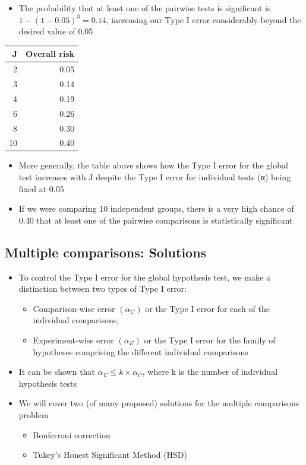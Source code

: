 \documentclass[
]{book}
\providecommand{\tightlist}{%
  \setlength{\itemsep}{0pt}\setlength{\parskip}{0pt}}
\begin{document}
\begin{itemize}
  \begin{itemize}
  \tightlist
  \item
    The probability that at least one of the pairwise tests is significant is \(1-(1-0.05)^3 = 0.14\), increasing our Type I error considerably beyond the desired value of 0.05
  \end{itemize}
\end{itemize}

\begin{tabular}{r|r}
\hline
J &  Overall risk\\
\hline
2 & 0.05\\
\hline
3 & 0.14\\
\hline
4 & 0.19\\
\hline
6 & 0.26\\
\hline
8 & 0.30\\
\hline
10 & 0.40\\
\hline
\end{tabular}

\begin{itemize}
\tightlist
\item
  More generally, the table above shows how the Type I error for the global test increases with J despite the Type I error for individual tests (α) being fixed at 0.05
\item
  If we were comparing 10 independent groups, there is a very high chance of 0.40 that at least one of the pairwise comparisons is statistically significant
\end{itemize}

\hypertarget{multiple-comparisons-solutions}{%
\subsection{Multiple comparisons: Solutions}\label{multiple-comparisons-solutions}}

\begin{itemize}
\tightlist
\item
  To control the Type I error for the global hypothesis test, we make a distinction between two types of Type I error:

  \begin{itemize}
  \tightlist
  \item
    Comparison-wise error \((α_C)\) or the Type I error for each of the individual comparisons,
  \item
    Experiment-wise error \((α_E)\) or the Type I error for the family of hypotheses comprising the different individual comparisons
  \end{itemize}
\item
  It can be shown that \(α_E ≤ k × α_C\), where k is the number of individual hypothesis tests
\item
  We will cover two (of many proposed) solutions for the multiple comparisons problem

  \begin{itemize}
  \tightlist
  \item
    Bonferroni correction
  \item
    Tukey's Honest Significant Method (HSD)
  \end{itemize}
\end{itemize}
\end{document}
